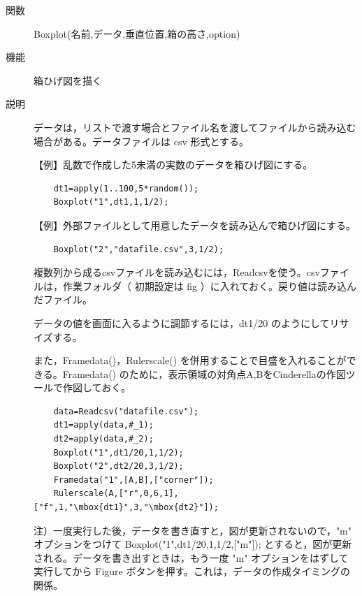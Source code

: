 \documentclass[papersize,a4paper,12pt,uplatex]{jsarticle}
\begin{document}
\begin{description}

\hypertarget{boxplot}{}
\item[関数]  Boxplot(名前,データ,垂直位置,箱の高さ,option)
\item[機能]  箱ひげ図を描く
\item[説明]  データは，リストで渡す場合とファイル名を渡してファイルから読み込む場合がある。データファイルは csv 形式とする。

\vspace{\baselineskip}
【例】乱数で作成した5未満の実数のデータを箱ひげ図にする。

\begin{verbatim}
    dt1=apply(1..100,5*random());
    Boxplot("1",dt1,1,1/2);
\end{verbatim}
\vspace{\baselineskip}
\hspace{20mm} 

\vspace{\baselineskip}
【例】外部ファイルとして用意したデータを読み込んで箱ひげ図にする。
\begin{verbatim}
    Boxplot("2","datafile.csv",3,1/2);
\end{verbatim}

\vspace{\baselineskip}
複数列から成るcsvファイルを読み込むには，Readcsvを使う。csvファイルは，作業フォルダ（ 初期設定は fig ）に入れておく。戻り値は読み込んだファイル。
  
データの値を画面に入るように調節するには，dt1/20 のようにしてリサイズする。
 
また，Framedata()，Rulerscale() を併用することで目盛を入れることができる。Framedata() のために，表示領域の対角点A,BをCinderellaの作図ツールで作図しておく。

\begin{verbatim}
    data=Readcsv("datafile.csv");
    dt1=apply(data,#_1);
    dt2=apply(data,#_2);
    Boxplot("1",dt1/20,1,1/2);
    Boxplot("2",dt2/20,3,1/2);
    Framedata("1",[A,B],["corner"]);
    Rulerscale(A,["r",0,6,1],["f",1,"\mbox{dt1}",3,"\mbox{dt2}"]);
\end{verbatim}
 \begin{center}  \end{center}

注）一度実行した後，データを書き直すと，図が更新されないので，"m" オプションをつけて
    Boxplot("1",dt1/20,1,1/2,["m"]); とすると，図が更新される。データを書き出すときは，もう一度 "m" オプションをはずして実行してから Figure ボタンを押す。これは，データの作成タイミングの関係。


\end{description}
\end{document}
